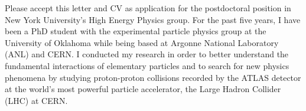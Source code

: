 \documentclass[a4paper]{article}
\begin{document}
\fontsize{12}{15}
\selectfont



\vspace{0.3cm}

Please accept this letter and CV as application for the postdoctoral position in New York University's High Energy Physics group.
For the past five years, I have been a PhD student with the experimental particle physics group at the University of Oklahoma 
while being based at Argonne National Laboratory (ANL) and CERN.
I conducted  my research in order to  better understand the fundamental interactions of elementary particles 
and to search for new physics phenomena by studying proton-proton collisions recorded by the ATLAS detector at the world's
most powerful particle accelerator, the Large Hadron Collider (LHC) at CERN.
\end{document}
